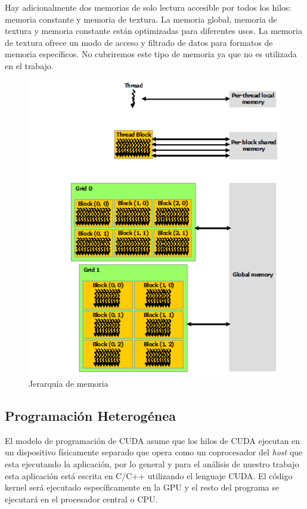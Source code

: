 \documentclass[a4paper,openright,12pt, oneside]{book}
\begin{document}
Hay adicionalmente dos memorias de solo lectura accesible por todos los hilos: memoria
constante y memoria de textura. La memoria global, memoria de textura y memoria
constante est\'an optimizadas para diferentes usos. La memoria de textura ofrece un
modo de acceso y filtrado de datos para formatos de memoria espec\'ificos. No cubriremos
este tipo de memoria ya que no es utilizada en el trabajo.

\begin{figure}[!htbp]
  \begin{center}
    \leavevmode

    \includegraphics[]{memory-hierarchy.png}

    \caption{Jerarqu\'ia de memoria}
    \label{CUDA3}
  \end{center}
\end{figure}


\subsection*{Programaci\'on Heterog\'enea}

El modelo de programaci\'on de CUDA asume que los hilos de CUDA ejecutan en un dispositivo
f\'isicamente separado que opera como un coprocesador del \textit{host} que esta ejecutando
la aplicaci\'on, por lo general y para el an\'alisis de nuestro trabajo esta aplicaci\'on 
est\'a escrita en C/C++ utilizando el lenguaje CUDA. El c\'odigo kernel ser\'a ejecutado
espec\'ificamente en la GPU y el resto del programa se ejecutar\'a en el procesador
central o CPU.
\end{document}
